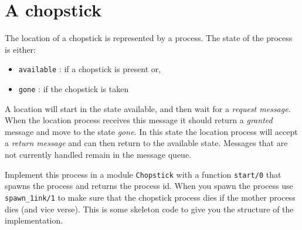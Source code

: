 \documentclass[a4paper,11pt]{article}
\begin{document}
    \section{A chopstick}
    
    The location of a chopstick is represented by a process. The state of
    the process is either:
    
    \begin{itemize}
    \item {\tt available} : if a chopstick is present or,
    \item {\tt gone} : if the chopstick is taken
    \end{itemize}
    
    A location will start in the state available, and then wait for a {\em request message}. When the location process receives this message it
    should return a {\em granted} message and move to the state {\em gone}.
    In this state the location process will accept a {\em return message} 
    and can then return to the available state. Messages that are not currently handled remain in the message queue.
    
    \begin{figure}[h!]
        \centering
    \end{figure}
    
    Implement this process in a module {\tt Chopstick} with a
    function {\tt start/0} that spawns the process and returns the process
    id. When you spawn the process use {\tt spawn\_1ink/1} to make sure
    that the chopstick process dies if the mother process dies (and vice
    verse). This is some skeleton code to give you the structure of the
    implementation.
    
\end{document}

